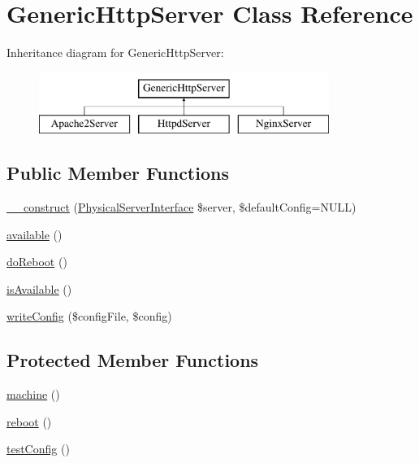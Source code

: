 \hypertarget{classGenericHttpServer}{\section{Generic\-Http\-Server Class Reference}
\label{classGenericHttpServer}
}
Inheritance diagram for Generic\-Http\-Server\-:\begin{figure}[H]
\begin{center}
\leavevmode
\includegraphics[height=2.000000cm]{classGenericHttpServer}
\end{center}
\end{figure}
\subsection*{Public Member Functions}
\begin{DoxyCompactItemize}
\item 
\hyperlink{classGenericHttpServer_a453ec35a3f6b4f9eb283cdecfcc2ddfb}{\-\_\-\-\_\-construct} (\hyperlink{interfacePhysicalServerInterface}{Physical\-Server\-Interface} \$server, \$default\-Config=N\-U\-L\-L)
\item 
\hyperlink{classGenericHttpServer_aa17c5a79c7269b7dd1407466783a3f8b}{available} ()
\item 
\hyperlink{classGenericHttpServer_aadaefaa2c7866c61b6e5c47f5ba9cb52}{do\-Reboot} ()
\item 
\hyperlink{classGenericHttpServer_a09f17032d29735f1e4ebcf0b8a8e110f}{is\-Available} ()
\item 
\hyperlink{classGenericHttpServer_a31f8dd33820bd62522382f5b6b0117c5}{write\-Config} (\$config\-File, \$config)
\end{DoxyCompactItemize}
\subsection*{Protected Member Functions}
\begin{DoxyCompactItemize}
\item 
\hyperlink{classGenericHttpServer_a5a3529075164ac5fd6ed20753fb14629}{machine} ()
\item 
\hyperlink{classGenericHttpServer_a8779091c2ade3c5123f83f3533308b62}{reboot} ()
\item 
\hyperlink{classGenericHttpServer_ae6308dbf9732cb602c0dafa77826aed2}{test\-Config} ()
\end{DoxyCompactItemize}
